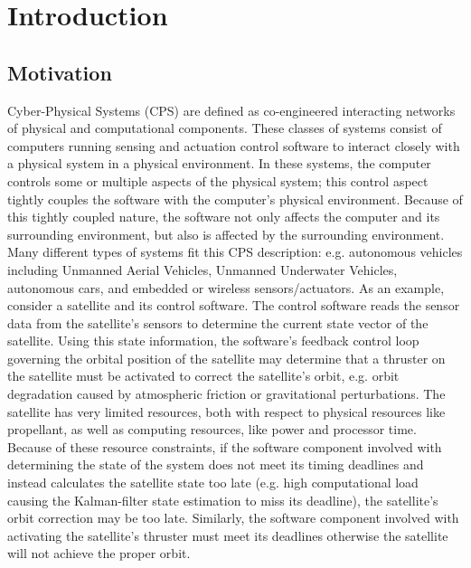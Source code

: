 \chapter{Introduction}
\label{ch:intro}

\section{Motivation}
\label{sec:motivation}

Cyber-Physical Systems (CPS) are defined as co-engineered interacting
networks of physical and computational components.  These classes of
systems consist of computers running sensing and actuation control
software to interact closely with a physical system in a physical
environment.  In these systems, the computer controls some or multiple
aspects of the physical system; this control aspect tightly couples
the software with the computer's physical environment.  Because of
this tightly coupled nature, the software not only affects the
computer and its surrounding environment, but also is affected by the
surrounding environment.  Many different types of systems fit this CPS
description: e.g. autonomous vehicles including Unmanned Aerial
Vehicles, Unmanned Underwater Vehicles, autonomous cars, and embedded
or wireless sensors/actuators.  As an example, consider a satellite
and its control software.  The control software reads the sensor data
from the satellite's sensors to determine the current state vector of
the satellite.  Using this state information, the software's feedback
control loop governing the orbital position of the satellite may
determine that a thruster on the satellite must be activated to
correct the satellite's orbit, e.g. orbit degradation caused by
atmospheric friction or gravitational perturbations.  The satellite
has very limited resources, both with respect to physical resources
like propellant, as well as computing resources, like power and
processor time.  Because of these resource constraints, if the
software component involved with determining the state of the system
does not meet its timing deadlines and instead calculates the
satellite state too late (e.g. high computational load causing the
Kalman-filter state estimation to miss its deadline), the satellite's
orbit correction may be too late.  Similarly, the software component
involved with activating the satellite's thruster must meet its
deadlines otherwise the satellite will not achieve the proper orbit.

